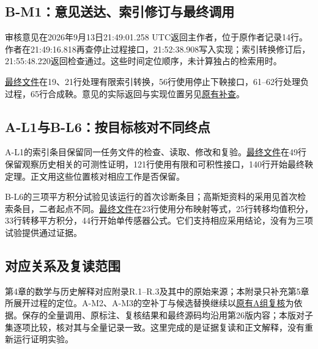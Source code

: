 \subsection[B-M1：意见送达、索引修订与最终调用]{\texorpdfstring{\protect\hypertarget{t2}{}B-M1：意见送达、索引修订与最终调用}{B-M1：意见送达、索引修订与最终调用}}
审核意见在2026年9月13日21:49:01.258 UTC返回主作者，位于原作者记录14行。作者在21:49:16.818再查停止过程接口，21:52:38.908写入实现；索引转换修订后，21:55:48.220返回检查通过。这些时间定位顺序，未计算独占的检索用时。

\href{research/final_sources/acceptance/r2-m1-b/technical/saved-sources/ProbabilityTheory/chapter_13/thm_13_17.lean}{最终文件}在19、21行处理有限索引转换，56行使用停止下鞅接口，61–62行处理负过程，65行合成鞅。意见的实际返回与实现位置另见\href{research/semantic/review_B_addendum.json}{原有补查}。

\subsection[A-L1与B-L6：按目标核对不同终点]{\texorpdfstring{\protect\hypertarget{t3}{}A-L1与B-L6：按目标核对不同终点}{A-L1与B-L6：按目标核对不同终点}}
A-L1的索引条目保留同一任务文件的检查、读取、修改和复验。\href{research/final_sources/acceptance/r2-l1-a/technical/saved-sources/ProbabilityTheory/chapter_13/prob_13_9.lean}{最终文件}在49行保留观察历史相关的可测性证明，121行使用有限和可积性接口，140行开始最终鞅定理。正文用这些位置核对相应工作是否保留。

B-L6的三项平方积分试验见该运行的首次诊断条目；高斯矩资料的采用见首次检索条目，二者起点不同。\href{research/final_sources/acceptance/r2-l6-b/technical/saved-sources/ProbabilityTheory/chapter_12/prob_12_5.lean}{最终文件}在23行使用分布映射等式，25行转移均值积分，33行转移平方积分，44行开始单传感器公式。它们支持相应采用结论，没有为三项试验提供通过证据。

\subsection[对应关系及复读范围]{\texorpdfstring{\protect\hypertarget{t4}{}对应关系及复读范围}{对应关系及复读范围}}
第4章的数学与历史解释对应附录R.1–R.3及其中的原始来源；本附录只补充第5章所展开过程的定位。A-M2、A-M3的空补丁与候选替换继续以\href{research/semantic/review_A.json}{原有A组复核}为依据。保存的全量调用、原标注、复核结果和最终源码均沿用第26版内容；本版对子集逐项比较，核对其与全量记录一致。这里完成的是证据复读和正文解释，没有重新运行证明实验。

\n